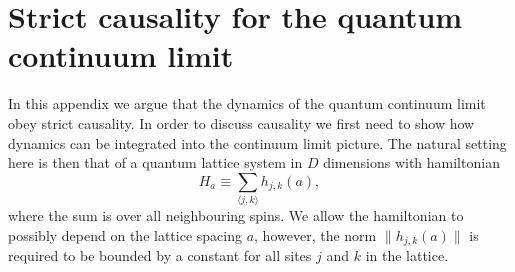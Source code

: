 \documentclass[prl,twocolumn,lengthcheck,superscriptaddress]{revtex4-1}
\theoremstyle{definition}
\theoremstyle{remark}
\begin{document}

\section{Strict causality for the quantum continuum limit}
In this appendix we argue that the dynamics of the quantum continuum limit obey strict causality. In order to discuss causality we first need to show how dynamics can be integrated into the continuum limit picture. The natural setting here is then that of a quantum lattice system in $D$ dimensions with hamiltonian 
\begin{equation}
	H_a \equiv \sum_{\langle j,k\rangle } h_{j,k}(a),
\end{equation}
where the sum is over all neighbouring spins. We allow the hamiltonian to possibly depend on the lattice spacing $a$, however, the norm $\|h_{j,k}(a)\|$ is required to be bounded by a constant for all sites $j$ and $k$ in the lattice. 
\end{document}
